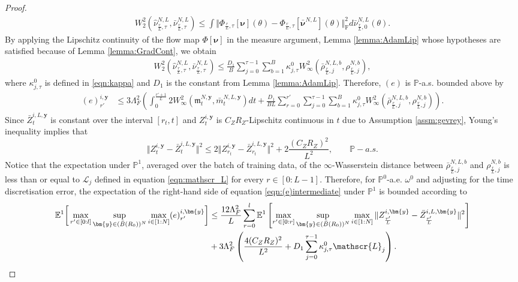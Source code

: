 \documentclass{article}
\begin{document}
\begin{appendices}
\begin{proof}
\begin{align*}
   W_2^2(\hat \nu^{N,L}_{\frac{r}{L},\tau}, \bar \nu^{N,L}_{\frac{r}{L},\tau}) \le \int\Vert \Phi_{\frac{r}{L},\tau}[\bm\nu](\theta)-\Phi_{\frac{r}{L},\tau}[\bm{\bar\nu}^{N,L}](\theta)\Vert_\mathrm{F}^2 d\bar\nu^{N,L}_{\frac{r}{L},0}(\theta).
\end{align*}
By applying the Lipschitz continuity of the flow map $\Phi[\bm\nu]$ in the measure argument, Lemma \ref{lemma:AdamLip} whose hypotheses are satisfied because of Lemma \ref{lemma:GradCont}, we obtain
\begin{align}\label{eqn:boundparams}
    W_2^2(\hat \nu^{N,L}_{\frac{r}{L},\tau}, \bar \nu^{N,L}_{\frac{r}{L},\tau})\le \frac{D_1}{B} \sum_{j=0}^{\tau-1}\sum_{b=1}^B \kappa^0_{j,\tau}W^2_{\infty}(\bar\rho^{N,L,b}_{\frac{r}{L},j},\rho^{N,b}_{\frac{r}{L},j}),
\end{align}
where $\kappa^0_{j,\tau}$ is defined in \eqref{eqn:kappa} and $D_1$ is the constant from Lemma \ref{lemma:AdamLip}. Therefore, $(e)$ is $\mathbb P$-a.s. bounded above by
\begin{align}\label{eqn:(e)intermediate}
 (e)^{i,\bm{y}}_{r'}&\le 3\Lambda_F^2\left(\int_{0}^{\frac{r'+1}{L}} 2 W_\infty^2\left(\mathfrak{m}^{N,\bm{y}}_t,\bar m^{N,L,\bm{y}}_t \right)dt+\frac{D_1}{BL}\sum_{r=0}^{r'}\sum_{j=0}^{\tau-1}\sum_{b=1}^B \kappa^0_{j,\tau}  W^2_{\infty}(\bar\rho^{N,L,b}_{\frac{r}{L},j},\rho^{N,b}_{\frac{r}{L},j})\right).
\end{align}
 Since $\bar Z^{i,L,\bm{y}}_t$ is constant over the interval $[r_t,t]$ and $Z^{i,\bm{y}}_{t}$ is $C_Z R_Z$-Lipschitz continuous in $t$ due to Assumption \ref{assm:gevrey}, Young's inequality implies that
\[
\Vert Z^{i,\bm{y}}_{t}-\bar Z^{i,L,\bm{y}}_{t}\Vert^2\le 2\Vert Z^{i,\bm{y}}_{r_t}-\bar Z^{i,L,\bm{y}}_{r_t}\Vert^2+2\frac{(C_Z R_Z)^2}{L^2}, \qquad \mathbb P-a.s.
\]
Notice that the expectation under $\mathbb P^1$, averaged over the batch of training data, of the $\infty$-Wasserstein distance between $\bar\rho^{N,L,b}_{\frac{r}{L},j}$ and $\rho^{N,b}_{\frac{r}{L},j}$ is less than or equal to $\mathscr L_j$ defined in equation \eqref{eqn:mathscr_L} for every $r\in[0:L-1]$.
Therefore, for $\mathbb P^0$-a.e. $\omega^0$ and adjusting for the time discretisation error, the expectation of the right-hand side of equation \eqref{eqn:(e)intermediate} under $\mathbb P^1$ is bounded according to
\begin{align}
    \mathbb E^1\bigg[ \max_{r'\in[0: l]} \sup_{\bm{y}\in (\bar B(R_0))^N}\max_{ i \in [1:N]}(e)^{i,\bm{y}}_{r'}\bigg] &\le \frac{12\Lambda_F^2}{L} \sum_{r=0}^l\mathbb E^1 \left[\max_{r'\in[0:r]}\sup_{\bm{y}\in(\bar B(R_0))^N}\max_{i\in[1:N]}\Vert Z^{i,\bm{y}}_{\frac{r'}{L}}-\bar Z^{i,L,\bm{y}}_{\frac{r'}{L}}\Vert^2\right]\notag\\& +3\Lambda_F^2 \left(\frac{4(C_Z R_Z)^2}{L^2}+ D_1\sum_{j=0}^{\tau-1}\kappa^0_{j,\tau} \mathscr{L}_j \right).\label{eqn:(e)}

\end{align}
\end{proof}
\end{appendices}
\end{document}
